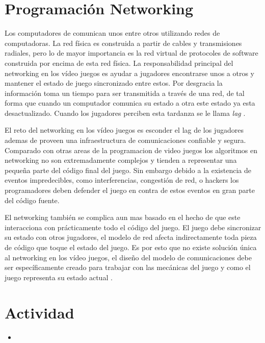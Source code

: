 \section{Programación Networking}
Los computadores de comunican unos entre otros utilizando redes de computadoras. La red física es construida a partir de cables y transmisiones radiales, pero lo de mayor importancia es la red virtual de protocoles de software construida por encima de esta red física. La responsabilidad principal del networking en los vídeo juegos es ayudar a jugadores encontrarse unos a otros y mantener el estado de juego sincronizado entre estos. Por desgracia la información toma un tiempo para ser transmitida a través de una red, de tal forma que cuando un computador comunica su estado a otra este estado ya esta desactualizado. Cuando los jugadores perciben esta tardanza se le llama \emph{lag} \cite[p.~356]{jenkinscreatinggames}.

El reto del networking en los vídeo juegos es esconder el lag de los jugadores ademas de proveen una infraestructura de comunicaciones confiable y segura. Comparado con otras areas de la programacion de video juegos los algoritmos en networking no son extremadamente complejos y tienden a representar una pequeña parte del código final del juego. Sin embargo debido a la existencia de eventos impredecibles, como interferencias, congestión de red, o hackers los programadores deben defender el juego en contra de estos eventos en gran parte del código fuente.

El networking también se complica aun mas basado en el hecho de que este interacciona con prácticamente todo el código del juego. El juego debe sincronizar su estado con otros jugadores, el modelo de red afecta indirectamente toda pieza de código que toque el estado del juego. Es por esto que no existe solución única al networking en los vídeo juegos, el diseño del modelo de comunicaciones debe ser específicamente creado para trabajar con las mecánicas del juego y como el juego representa su estado actual \cite{netaoe}.
\section{Actividad}
\begin{itemize}
\item {}
\end{itemize}